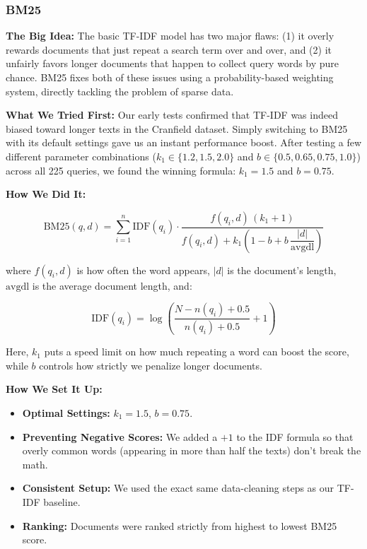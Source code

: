 \documentclass[runningheads]{llncs}
\begin{document}
\subsubsection{BM25}

\textbf{The Big Idea:}
The basic TF-IDF model has two major flaws: (1) it overly rewards documents that just repeat a search term over and over, and (2) it unfairly favors longer documents that happen to collect query words by pure chance. BM25 fixes both of these issues using a probability-based weighting system, directly tackling the problem of sparse data.

\textbf{What We Tried First:}
Our early tests confirmed that TF-IDF was indeed biased toward longer texts in the Cranfield dataset. Simply switching to BM25 with its default settings gave us an instant performance boost. After testing a few different parameter combinations ($k_1 \in \{1.2, 1.5, 2.0\}$ and $b \in \{0.5, 0.65, 0.75, 1.0\}$) across all 225 queries, we found the winning formula: $k_1 = 1.5$ and $b = 0.75$.

\textbf{How We Did It:}

\begin{equation}
    \text{BM25}(q, d)
    = \sum_{i=1}^{n}
      \text{IDF}(q_i) \cdot
      \frac{f(q_i, d)\,(k_1 + 1)}
           {f(q_i, d) + k_1\!\left(1 - b + b\,\dfrac{|d|}{\text{avgdl}}\right)}
\end{equation}

where $f(q_i, d)$ is how often the word appears, $|d|$ is the document's length, $\text{avgdl}$ is the average document length, and:

\begin{equation}
    \text{IDF}(q_i)
    = \log\!\left(\frac{N - n(q_i) + 0.5}{n(q_i) + 0.5} + 1\right)
\end{equation}

Here, $k_1$ puts a speed limit on how much repeating a word can boost the score, while $b$ controls how strictly we penalize longer documents.

\textbf{How We Set It Up:}
\begin{itemize}
    \item \textbf{Optimal Settings:} $k_1 = 1.5$, $b = 0.75$.
    \item \textbf{Preventing Negative Scores:} We added a $+1$ to the IDF formula so that overly common words (appearing in more than half the texts) don't break the math.
    \item \textbf{Consistent Setup:} We used the exact same data-cleaning steps as our TF-IDF baseline.
    \item \textbf{Ranking:} Documents were ranked strictly from highest to lowest BM25 score.
\end{itemize}
\end{document}
